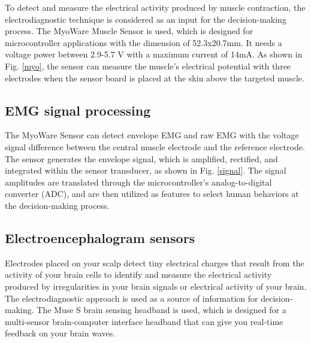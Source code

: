 To detect and measure the electrical activity produced by muscle
contraction, the electrodiagnostic technique is considered as an input
for the decision-making process. The MyoWare Muscle Sensor is used,
which is designed for microcontroller applications \cite{myo} with the
dimension of 52.3x20.7mm.  It needs a voltage power between 2.9-5.7 V
with a maximum current of 14mA. As shown in Fig. \ref{myo}, the sensor
can measure the muscle's electrical potential with three electrodes
when the sensor board is placed at the skin above the targeted muscle.



\subsection{EMG signal processing}

The MyoWare Sensor can detect envelope EMG and raw EMG with the
voltage signal difference between the central muscle electrode and the
reference electrode. The sensor generates the envelope signal, which
is amplified, rectified, and integrated within the sensor transducer,
as shown in Fig. \ref{signal}. The signal amplitudes are translated
through the microcontroller's analog-to-digital converter (ADC), and
are then utilized as features to select human behaviors at the
decision-making process.






\subsection{Electroencephalogram sensors}
Electrodes placed on your scalp detect tiny electrical charges that
result from the activity of your brain cells to identify and measure
the electrical activity produced by irregularities in your brain
signals or electrical activity of your brain.
The electrodiagnostic approach is used as a source of information
for decision-making.
The Muse S brain sensing headband is used, which is designed for
a multi-sensor brain-computer interface headband that can give you
real-time feedback on your brain waves.

